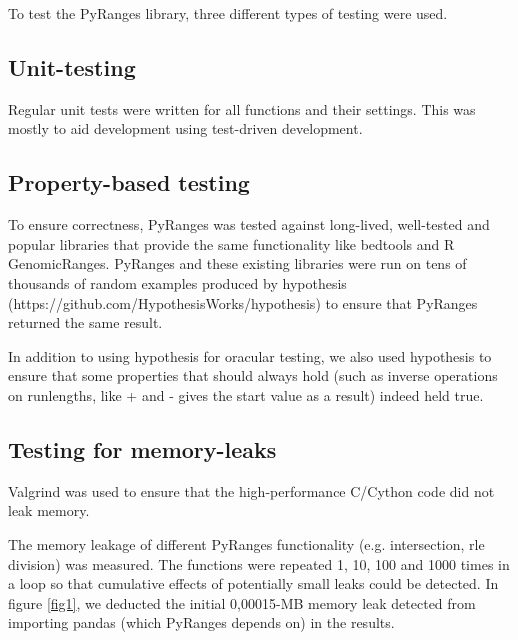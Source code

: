 \documentclass[10pt,letterpaper]{article}
\begin{document}
To test the PyRanges library, three different types of testing were used.

\subsection*{Unit-testing}

Regular unit tests were written for all functions and their settings. This was
mostly to aid development using test-driven development.

\subsection*{Property-based testing}

To ensure correctness, PyRanges was tested against long-lived, well-tested and
popular libraries that provide the same functionality like bedtools and R
GenomicRanges. PyRanges and these existing libraries were run on tens of
thousands of random examples produced by hypothesis
(https://github.com/HypothesisWorks/hypothesis) to ensure that PyRanges returned
the same result.

In addition to using hypothesis for oracular testing, we also used hypothesis to
ensure that some properties that should always hold (such as inverse operations
on runlengths, like + and - gives the start value as a result) indeed held true.

\subsection*{Testing for memory-leaks}

Valgrind \cite{Nethercote:2007:SBM:1254810.1254820} was used to ensure that the
high-performance C/Cython code did not leak memory.

The memory leakage of different PyRanges functionality (e.g. intersection, rle
division) was measured. The functions were repeated 1, 10, 100 and 1000 times in
a loop so that cumulative effects of potentially small leaks could be detected.
In figure \ref{fig1}, we deducted the initial 0,00015-MB memory leak detected
from importing pandas (which PyRanges depends on) in the results.
\end{document}
